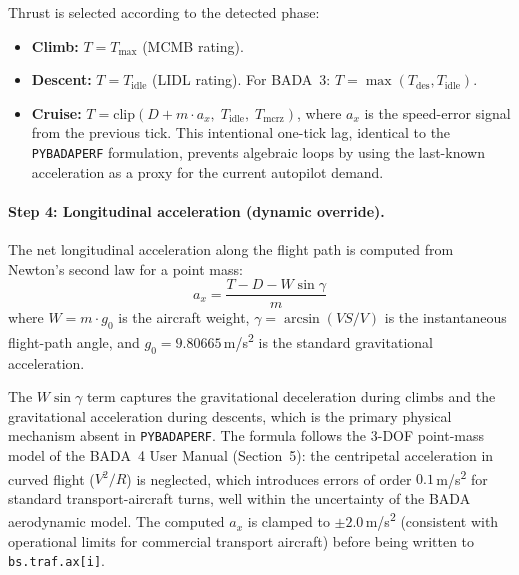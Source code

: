 Thrust is selected according to the detected phase:
\begin{itemize}
    \item \textbf{Climb:} $T = T_{\max}$ (MCMB rating).
    \item \textbf{Descent:} $T = T_{\text{idle}}$ (LIDL rating).  For BADA~3: $T = \max(T_{\text{des}}, T_{\text{idle}})$.
    \item \textbf{Cruise:} $T = \text{clip}(D + m \cdot a_x,\; T_{\text{idle}},\; T_{\text{mcrz}})$, where $a_x$ is the speed-error signal from the previous tick. This intentional one-tick lag, identical to the \texttt{PYBADAPERF} formulation, prevents algebraic loops by using the last-known acceleration as a proxy for the current autopilot demand.
\end{itemize}

\paragraph{Step 4: Longitudinal acceleration (dynamic override).}
The net longitudinal acceleration along the flight path is computed from Newton's second law for a point mass:
\begin{equation}
    a_x = \frac{T - D - W \sin \gamma}{m}
    \label{eq:ax}
\end{equation}
where $W = m \cdot g_0$ is the aircraft weight, $\gamma = \arcsin(VS / V)$ is the instantaneous flight-path angle, and $g_0 = 9.80665$\,m/s\textsuperscript{2} is the standard gravitational acceleration.

The $W\sin\gamma$ term captures the gravitational deceleration during climbs and the gravitational acceleration during descents, which is the primary physical mechanism absent in \texttt{PYBADAPERF}.  The formula follows the 3-DOF point-mass model of the BADA~4 User Manual (Section~5): the centripetal acceleration in curved flight ($V^2/R$) is neglected, which introduces errors of order $0.1$\,m/s\textsuperscript{2} for standard transport-aircraft turns, well within the uncertainty of the BADA aerodynamic model.  The computed $a_x$ is clamped to $\pm 2.0$\,m/s\textsuperscript{2} (consistent with operational limits for commercial transport aircraft) before being written to \texttt{bs.traf.ax[i]}.

